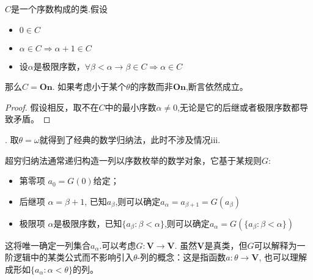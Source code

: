 \begin{Them}[超穷归纳法]$C$是一个序数构成的类.假设
    \begin{itemize}
        \item $0\in C$
        \item $\alpha \in C \Rightarrow \alpha +1 \in C$
        \item 设$\alpha $是极限序数，$\forall \beta <\alpha \rightarrow \beta \in C \Rightarrow \alpha \in C$
    \end{itemize}
    那么$C=\mathbf{On}$.
    如果考虑小于某个$\theta$的序数而非$\mathbf{On}$,断言依然成立。
    \begin{proof}
        假设相反，取不在$C$中的最小序数$\alpha \neq 0$,无论是它的后继或者极限序数都导致矛盾。
    \end{proof}
\end{Them}
\begin{Rmk}[与经典数学归纳法的关系].
    取$\theta = \omega$就得到了经典的数学归纳法，此时不涉及情况iii.

    超穷归纳法通常递归构造一列以序数枚举的数学对象，它基于某规则$G$:
    \begin{itemize}
        \item 第零项 $a_0=G(0)$给定；
        \item 后继项 $\alpha = \beta + 1$, 已知$a_{\beta}$,则可以确定$a_{\alpha}=a _{\beta+1}=G(a_{\beta })$
        \item 极限项 $\alpha $是极限序数，已知$\{a_{\beta}:\beta < \alpha\}$,则可以确定$a_{\alpha}=G(\{a_{\beta}:\beta <\alpha\})$
    \end{itemize}
    这将唯一确定一列集合$a_{\alpha}$.可以考虑$G:\mathbf{V}\rightarrow \mathbf{V}$. 虽然$\mathbf{V}$是真类，但$G$可以解释为一阶逻辑中的某类公式而不影响引入$\theta$-列的概念：这是指函数$a:\theta \rightarrow \mathbf{V}$, 也可以理解成形如$\{a_{\alpha}:\alpha <\theta\}$的列。
\end{Rmk}

